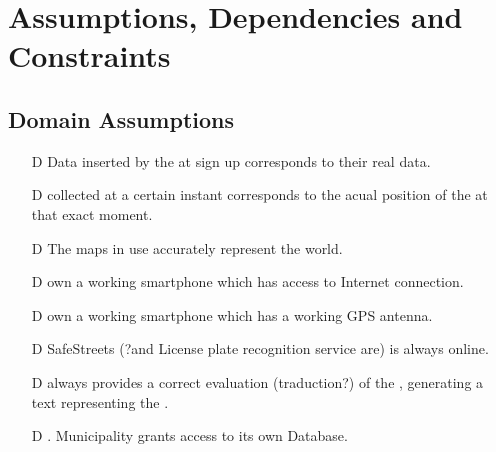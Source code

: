 \documentclass[../../rasd.tex]{subfiles}
\begin{document}
\section{Assumptions, Dependencies and Constraints}
	\subsection{Domain Assumptions}
	 	\begin{itemize}
	 		\item[D\subs{1}]Data inserted by the  at sign up corresponds to their real data.
	 		\item[D\subs{2}] collected at a certain instant corresponds to the acual position of the  at that exact moment.
	 		\item[D\subs{3}]The maps in use accurately represent the world.
	 		\item[D\subs{4}] own a working smartphone which has access to Internet connection.
	 		\item[D\subs{5}] own a working smartphone which has a working GPS antenna.
	 		\item[D\subs{6}]SafeStreets (?and License plate recognition service are) is always online.
	 		\item[D\subs{7}] always provides a correct evaluation (traduction?) of the , generating a text representing the .
	 		\item[D\subs{8}]. Municipality grants access to its own  Database.
	 		
	 	\end{itemize}
\end{document}
